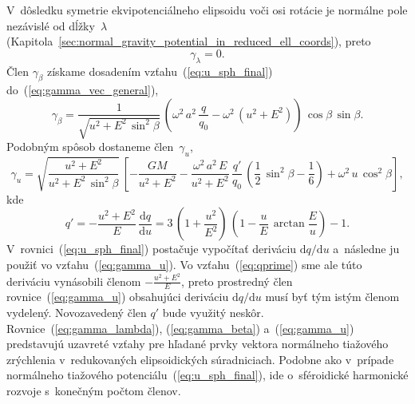 \documentclass[a4paper,12pt]{book}
\newcommand{\diff}{\mathrm d}
\begin{document}
V~dôsledku symetrie ekvipotenciálneho elipsoidu voči osi rotácie je normálne 
pole nezávislé od dĺžky~$\lambda$ 
(Kapitola~\ref{sec:normal_gravity_potential_in_reduced_ell_coords}), preto
%
\begin{equation}
\label{eq:gamma_lambda}
\gamma_\lambda = 0{.}
\end{equation}
%
Člen $\gamma_\beta$ získame dosadením vzťahu~(\ref{eq:u_sph_final}) 
do~(\ref{eq:gamma_vec_general}),
%
\begin{equation}
\label{eq:gamma_beta}
\gamma_\beta = \frac{1}{\sqrt{u^2 + E^2 \, \sin^2\beta}} \, \left( \omega^2 \, 
a^2 \, \frac{q}{q_0} - \omega^2 \, (u^2 + E^2) \right) \, \cos\beta \, 
\sin\beta{.}
\end{equation}
%
Podobným spôsob dostaneme člen~$\gamma_u$,
%
\begin{equation}
\label{eq:gamma_u}
\gamma_u = \sqrt{\dfrac{u^2 + E^2}{u^2 + E^2 \, \sin^2\beta}} \, \left[ 
-\frac{GM}{u^2 + E^2} - \frac{\omega^2 \, a^2 \, E}{u^2 + E^2} \, 
\frac{q'}{q_0} \, \left( \frac{1}{2} \, \sin^2\beta - \frac{1}{6} \right) 
+ \omega^2 \, u \, \cos^2\beta \right]{,}
\end{equation}
%
kde \parencite{MoritzPhysicalGeodesy}
%
\begin{equation}
\label{eq:qprime}
q' = -\frac{u^2 + E^2}{E} \, \frac{\diff q}{\diff u} = 3 \, \left( 
1 + \frac{u^2}{E^2} \right) \, \left(  1 - \frac{u}{E} \, \arctan\frac{E}{u} 
\right) - 1{.}
\end{equation}
%
V~rovnici~(\ref{eq:u_sph_final}) postačuje vypočítať deriváciu $\diff q \slash 
\diff u$ a~následne ju použiť vo vzťahu~(\ref{eq:gamma_u}).  Vo 
vzťahu~(\ref{eq:qprime}) sme ale túto deriváciu vynásobili členom $-\frac{u^2 
+ E^2}{E}$, preto prostredný člen rovnice~(\ref{eq:gamma_u}) obsahujúci 
deriváciu $\diff q \slash \diff u$ musí byť tým istým členom vydelený.  
Novozavedený člen $q'$ bude využitý neskôr.  Rovnice~(\ref{eq:gamma_lambda}), 
(\ref{eq:gamma_beta}) a~(\ref{eq:gamma_u}) predstavujú uzavreté vzťahy pre 
hľadané prvky vektora normálneho tiažového zrýchlenia v~redukovaných 
elipsoidických súradniciach.  Podobne ako v~prípade normálneho tiažového 
potenciálu~(\ref{eq:u_sph_final}), ide o~sféroidické harmonické rozvoje 
s~konečným počtom členov.
\end{document}
